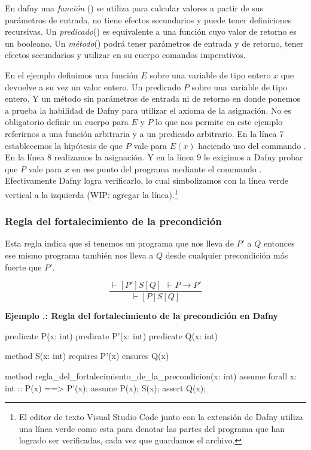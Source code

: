 \documentclass[12pt, a4paper, openany, fleqn]{book}
\newcounter{example}[chapter]
\renewcommand{\theexample}{\thechapter.\arabic{example}}
\newcommand{\example}[1]{
  \refstepcounter{example} %
  \vspace{1em}
  \noindent\textbf{Ejemplo \theexample: #1}
}
\newcommand{\hoareTheorem}[3]{\ensuremath{\vdash[#1]#2[#3]}}
\newcommand{\inferenceRule}[2]{
    \begin{equation*}
        \frac{#1}{#2}
    \end{equation*}
}
\begin{document}
    En dafny una \textit{función} () se utiliza para calcular valores a partir de sus parámetros de entrada, no tiene efectos secundarios y puede tener definiciones recursivas. Un \textit{predicado}() es equivalente a una función cuyo valor de retorno es un booleano. Un \textit{método}() podrá tener parámetros de entrada y de retorno, tener efectos secundarios y utilizar en su cuerpo comandos imperativos.

    En el ejemplo definimos una función $E$ sobre una variable de tipo entero $x$ que devuelve a su vez un valor entero.
    Un predicado $P$ sobre una variable de tipo entero.
    Y un método sin parámetros de entrada ni de retorno en donde ponemos a prueba la habilidad de Dafny para utilizar el axioma de la asignación.
    No es obligatorio definir un cuerpo para $E$ y $P$ lo que nos permite en este ejemplo referirnos a una función arbitraria y a un predicado arbitrario.
    En la línea 7 establecemos la hipótesis de que $P$ vale para $E(x)$ haciendo uso del commando .
    En la línea 8 realizamos la asignación.
    Y en la línea 9 le exigimos a Dafny probar que $P$ vale para $x$ en ese punto del programa mediante el commando .
    Efectivamente Dafny logra verificarlo, lo cual simbolizamos con la línea verde vertical a la izquierda (WIP: agregar la línea).\footnote{El editor de texto Visual Studio Code junto con la extensión de Dafny utiliza una línea verde como esta para denotar las partes del programa que han logrado ser verificadas, cada vez que guardamos el archivo.}
    \vspace{1em}

    \subsubsection*{Regla del fortalecimiento de la precondición}
    Esta regla indica que si tenemos un programa que nos lleva de $P'$ a $Q$ entonces ese mismo programa también nos lleva a $Q$ desde cualquier precondición más fuerte que $P'$.
    \inferenceRule{\hoareTheorem{P'}{S}{Q}\ \ \vdash P \rightarrow P'}{\hoareTheorem{P}{S}{Q}}

    \example{Regla del fortalecimiento de la precondición en Dafny}
    \begin{dafny}
        
predicate P(x: int)
predicate P'(x: int)
predicate Q(x: int)

method S(x: int)
    requires P'(x)
    ensures Q(x)

method regla_del_fortalecimiento_de_la_precondicion(x: int)
{
    assume forall x: int :: P(x) ==> P'(x);
    assume P(x);
    S(x);
    assert Q(x); 
}
    \end{dafny}
\end{document}

